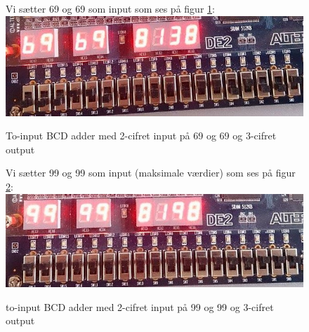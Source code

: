 \begin{enumerate}
\begin{figure}[h]
	Vi sætter 69 og 69 som input som ses på figur \ref{fig:BCD_2seg_adder_138}:
	\centering
	\includegraphics[scale=0.6]{pictures/Oevelse4/BCD_adder/BCD_2seg_adder_138.jpg}
	\caption{To-input BCD adder med 2-cifret input på 69 og 69 og 3-cifret output}
	\label{fig:BCD_2seg_adder_138}
\end{figure}

\begin{figure}[h]
	Vi sætter 99 og 99 som input (maksimale værdier) som ses på figur \ref{fig:BCD_2seg_adder_198}:
	\centering
	\includegraphics[scale=0.6]{pictures/Oevelse4/BCD_adder/BCD_2seg_adder_198.jpg}
	\caption{to-input BCD adder med 2-cifret input på 99 og 99 og 3-cifret output}
	\label{fig:BCD_2seg_adder_198}
\end{figure}
\end{enumerate}